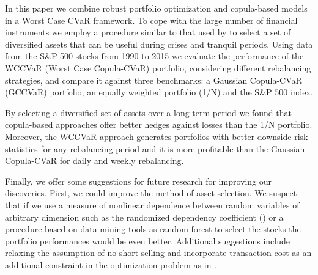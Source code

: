 \documentclass[a4paper,10pt]{article}
\begin{document}
In this paper we combine robust portfolio optimization and copula-based models in a Worst Case CVaR framework. To cope with the large number of financial instruments we employ a procedure similar to that used by \citet*{ggr06} to select a set of diversified assets that can be useful during crises and tranquil periods. Using data from the S\&P 500 stocks from 1990 to 2015 we evaluate the performance of the WCCVaR (Worst Case Copula-CVaR) portfolio, considering different rebalancing strategies, and compare it against three benchmarks: a Gaussian Copula-CVaR (GCCVaR) portfolio, an equally weighted portfolio (1/N) and the S\&P 500 index. 

By selecting a diversified set of assets over a long-term period we found that copula-based approaches offer better hedges against losses than the 1/N portfolio. Moreover, the WCCVaR approach generates portfolios with better downside risk statistics for any rebalancing period and it is more profitable than the Gaussian Copula-CVaR for daily and weekly rebalancing.

Finally, we offer some suggestions for future research for improving our discoveries. First, we could improve the method of asset selection. We suspect that if we use a measure of nonlinear dependence between random variables of arbitrary dimension such as the randomized dependency coefficient (\citet*{lopez2013randomized}) or a procedure based on data mining tools as random forest \citet*{dlrz10} to select the stocks the portfolio performances would be even better. 
Additional suggestions include relaxing the assumption of no short selling and incorporate transaction cost as an additional constraint in the optimization problem as in \citet*{krokhmal2002}.





\newpage
\end{document}
